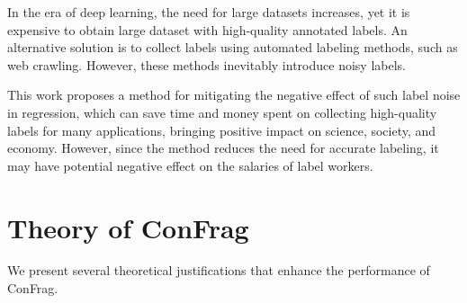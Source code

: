 \documentclass{article}
\theoremstyle{plain}
\theoremstyle{definition}
\theoremstyle{remark}
\begin{document}
In the era of deep learning, the need for large datasets increases, yet it is expensive to obtain large dataset with high-quality annotated labels.
An alternative solution is to collect labels using automated labeling methods, such as web crawling.
However, these methods inevitably introduce noisy labels.

This work proposes a method for mitigating the negative effect of such label noise in regression, which can save time and money spent on collecting high-quality labels for many applications, bringing positive impact on science, society, and economy.
However, since the method reduces the need for accurate labeling, it may have potential negative effect on the salaries of label workers.


\section{Theory of ConFrag}\label{sec:theory}
We present several theoretical justifications that enhance the performance of ConFrag.
\end{document}
